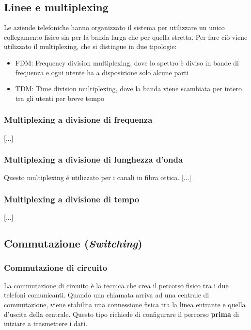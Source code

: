 \subsection{Linee e multiplexing}
Le aziende telefoniche hanno organizzato il sistema per utilizzare un unico collegamento fisico sia per la banda larga che per quella stretta.
Per fare ciò viene utilizzato il multiplexing, che si distingue in due tipologie:
\begin{itemize}
    \item FDM: Frequency division multiplexing, dove lo spettro è diviso in bande di frequenza e ogni utente ha a disposizione solo alcune parti
    \item TDM: Time division multiplexing, dove la banda viene scambiata per intero tra gli utenti per breve tempo
\end{itemize}

\subsubsection{Multiplexing a divisione di frequenza}
[...]

\subsubsection{Multiplexing a divisione di lunghezza d'onda}
Questo multiplexing è utilizzato per i canali in fibra ottica.
[...]

\subsubsection{Multiplexing a divisione di tempo}
[...]

\subsection{Commutazione (\textit{Switching})}

\subsubsection{Commutazione di circuito}
La commutazione di circuito è la tecnica che crea il percorso fisico tra i due telefoni comunicanti. 
Quando una chiamata arriva ad una centrale di commutazione, viene stabilita una connessione fisica tra la linea entrante e quella d'uscita della centrale.
Questo tipo richiede di configurare il percorso \textbf{prima} di iniziare a trasmettere i dati.


